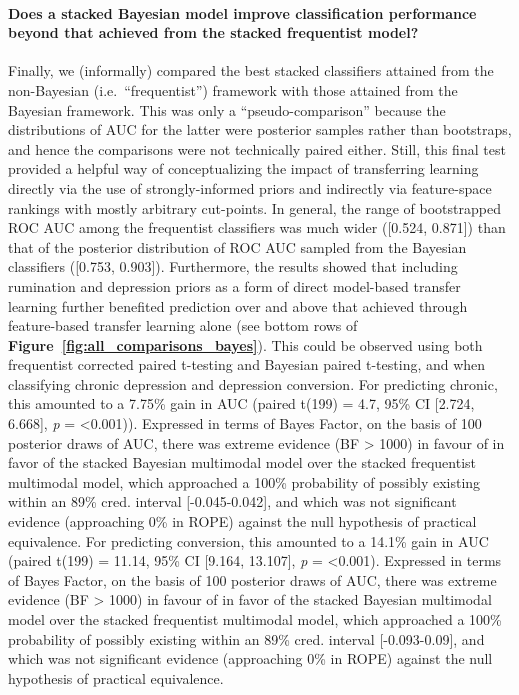 \documentclass[
  notitlepage]{article}
\begin{document}
\hypertarget{does-a-stacked-bayesian-model-improve-classification-performance-beyond-that-achieved-from-the-stacked-frequentist-model}{%
\paragraph{Does a stacked Bayesian model improve classification
performance beyond that achieved from the stacked frequentist
model?}\label{does-a-stacked-bayesian-model-improve-classification-performance-beyond-that-achieved-from-the-stacked-frequentist-model}}
Finally, we (informally) compared the best stacked classifiers attained
from the non-Bayesian (i.e.~``frequentist'') framework with those
attained from the Bayesian framework. This was only a
``pseudo-comparison'' because the distributions of AUC for the latter
were posterior samples rather than bootstraps, and hence the comparisons
were not technically paired either. Still, this final test provided a
helpful way of conceptualizing the impact of transferring learning
directly via the use of strongly-informed priors and indirectly via
feature-space rankings with mostly arbitrary cut-points. In general, the
range of bootstrapped ROC AUC among the frequentist classifiers was much
wider ({[}0.524, 0.871{]}) than that of the posterior distribution of
ROC AUC sampled from the Bayesian classifiers ({[}0.753, 0.903{]}).
Furthermore, the results showed that including rumination and depression
priors as a form of direct model-based transfer learning further
benefited prediction over and above that achieved through feature-based
transfer learning alone (see bottom rows of \textbf{Figure~\ref{fig:all_comparisons_bayes}}). This could be observed using both
frequentist corrected paired t-testing and Bayesian paired t-testing,
and when classifying chronic depression and depression conversion. For
predicting chronic, this amounted to a 7.75\% gain in AUC (paired t(199)
= 4.7, 95\% CI {[}2.724, 6.668{]}, \emph{p} = \textless0.001)).
Expressed in terms of Bayes Factor, on the basis of 100 posterior draws
of AUC, there was extreme evidence (BF \textgreater{} 1000) in favour of
in favor of the stacked Bayesian multimodal model over the stacked
frequentist multimodal model, which approached a 100\% probability of
possibly existing within an 89\% cred. interval {[}-0.045-0.042{]}, and
which was not significant evidence (approaching 0\% in ROPE) against the
null hypothesis of practical equivalence. For predicting conversion,
this amounted to a 14.1\% gain in AUC (paired t(199) = 11.14, 95\% CI
{[}9.164, 13.107{]}, \emph{p} = \textless0.001). Expressed in terms of
Bayes Factor, on the basis of 100 posterior draws of AUC, there was
extreme evidence (BF \textgreater{} 1000) in favour of in favor of the
stacked Bayesian multimodal model over the stacked frequentist
multimodal model, which approached a 100\% probability of possibly
existing within an 89\% cred. interval {[}-0.093-0.09{]}, and which was
not significant evidence (approaching 0\% in ROPE) against the null
hypothesis of practical equivalence.
\end{document}
